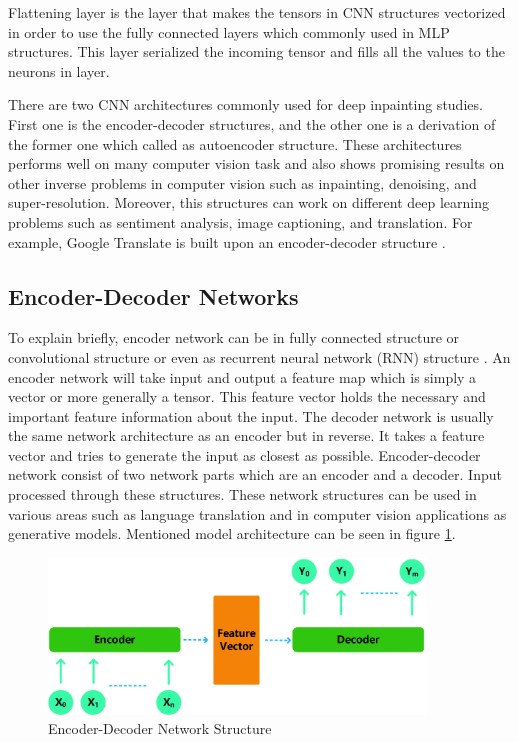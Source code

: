 Flattening layer is the layer that makes the tensors in CNN structures vectorized in order to use the fully connected layers which commonly used in MLP structures. This layer serialized the incoming tensor and fills all the values to the neurons in layer.

There are two CNN architectures commonly used for deep inpainting studies. First one is the encoder-decoder structures, and the other one is a derivation of the former one which called as autoencoder structure. These architectures performs well on many computer vision task and also shows promising results on other inverse problems in computer vision such as inpainting, denoising, and super-resolution. Moreover, this structures can work on different deep learning problems such as sentiment analysis, image captioning, and translation. For example, Google Translate is built upon an encoder-decoder structure \cite{google_translate}.

\subsection{Encoder-Decoder Networks}

To explain briefly, encoder network can be in fully connected structure or convolutional structure or even as recurrent neural network (RNN) structure \cite{rnn_seq2seq}. An encoder network will take input and output a feature map which is simply a vector or more generally a tensor. This feature vector holds the necessary and important feature information about the input. The decoder network is usually the same network architecture as an encoder but in reverse. It takes a feature vector and tries to generate the input as closest as possible. Encoder-decoder network consist of two network parts which are an encoder and a decoder. Input processed through these structures. These network structures can be used in various areas such as language translation \cite{google_translate} and in computer vision applications as generative models. Mentioned model architecture can be seen in figure \ref{fig:encoder_decoder}.

\begin{figure}[h!]
    \centering
    \includegraphics[width=10cm]{figures/chapter3/encoder-decoder.png}
    \vspace*{5mm}
    \caption{Encoder-Decoder Network Structure \cite{encoder_decoder}}
    \label{fig:encoder_decoder}
\end{figure}

